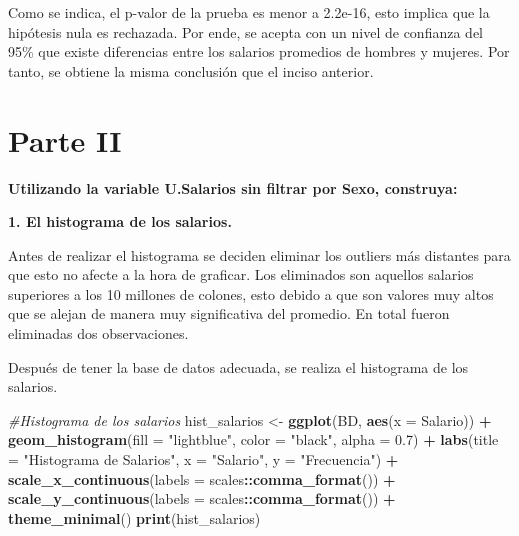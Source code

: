 \documentclass[
]{article}
\newenvironment{Shaded}{\begin{snugshade}}{\end{snugshade}}
\newcommand{\AttributeTok}[1]{\textcolor[rgb]{0.13,0.29,0.53}{#1}}
\newcommand{\CommentTok}[1]{\textcolor[rgb]{0.56,0.35,0.01}{\textit{#1}}}
\newcommand{\DecValTok}[1]{\textcolor[rgb]{0.00,0.00,0.81}{#1}}
\newcommand{\FloatTok}[1]{\textcolor[rgb]{0.00,0.00,0.81}{#1}}
\newcommand{\FunctionTok}[1]{\textcolor[rgb]{0.13,0.29,0.53}{\textbf{#1}}}
\newcommand{\NormalTok}[1]{#1}
\newcommand{\OtherTok}[1]{\textcolor[rgb]{0.56,0.35,0.01}{#1}}
\newcommand{\SpecialCharTok}[1]{\textcolor[rgb]{0.81,0.36,0.00}{\textbf{#1}}}
\newcommand{\StringTok}[1]{\textcolor[rgb]{0.31,0.60,0.02}{#1}}
\begin{document}
Como se indica, el p-valor de la prueba es menor a 2.2e-16, esto implica
que la hipótesis nula es rechazada. Por ende, se acepta con un nivel de
confianza del 95\% que existe diferencias entre los salarios promedios
de hombres y mujeres. Por tanto, se obtiene la misma conclusión que el
inciso anterior.

\hypertarget{parte-ii}{%
\section{Parte II}\label{parte-ii}}

\textbf{Utilizando la variable U.Salarios sin filtrar por Sexo,
construya:}

\textbf{1. El histograma de los salarios.}

Antes de realizar el histograma se deciden eliminar los outliers más
distantes para que esto no afecte a la hora de graficar. Los eliminados
son aquellos salarios superiores a los 10 millones de colones, esto
debido a que son valores muy altos que se alejan de manera muy
significativa del promedio. En total fueron eliminadas dos
observaciones.

\begin{Shaded}
\end{Shaded}

Después de tener la base de datos adecuada, se realiza el histograma de
los salarios.

\begin{Shaded}
\begin{Highlighting}[]
\CommentTok{\#Histograma de los salarios }
\NormalTok{hist\_salarios }\OtherTok{\textless{}{-}} \FunctionTok{ggplot}\NormalTok{(BD, }\FunctionTok{aes}\NormalTok{(}\AttributeTok{x =}\NormalTok{ Salario)) }\SpecialCharTok{+}
  \FunctionTok{geom\_histogram}\NormalTok{(}\AttributeTok{fill =} \StringTok{"lightblue"}\NormalTok{, }\AttributeTok{color =} \StringTok{"black"}\NormalTok{, }\AttributeTok{alpha =} \FloatTok{0.7}\NormalTok{) }\SpecialCharTok{+}
  \FunctionTok{labs}\NormalTok{(}\AttributeTok{title =} \StringTok{"Histograma de Salarios"}\NormalTok{, }\AttributeTok{x =} \StringTok{"Salario"}\NormalTok{, }\AttributeTok{y =} \StringTok{"Frecuencia"}\NormalTok{) }\SpecialCharTok{+} 
  \FunctionTok{scale\_x\_continuous}\NormalTok{(}\AttributeTok{labels =}\NormalTok{ scales}\SpecialCharTok{::}\FunctionTok{comma\_format}\NormalTok{()) }\SpecialCharTok{+}
  \FunctionTok{scale\_y\_continuous}\NormalTok{(}\AttributeTok{labels =}\NormalTok{ scales}\SpecialCharTok{::}\FunctionTok{comma\_format}\NormalTok{()) }\SpecialCharTok{+}
  \FunctionTok{theme\_minimal}\NormalTok{()}
\FunctionTok{print}\NormalTok{(hist\_salarios)}
\end{Highlighting}
\end{Shaded}
\end{document}
